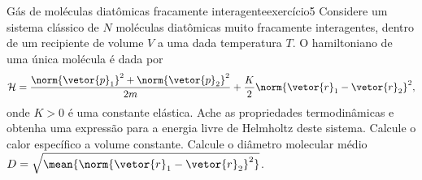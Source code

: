 \begin{exercício}{Gás de moléculas diatômicas fracamente interagente}{exercício5}
    Considere um sistema clássico de \(N\) moléculas diatômicas muito fracamente interagentes, dentro de um recipiente de volume \(V\) a uma dada temperatura \(T\). O hamiltoniano de uma única molécula é dada por
    \begin{equation*}
        \mathcal{H} = \frac{\norm{\vetor{p}_1}^2 + \norm{\vetor{p}_2}^2}{2m} + \frac{K}{2}\norm{\vetor{r}_1 - \vetor{r}_2}^2,
    \end{equation*}
    onde \(K > 0\) é uma constante elástica. Ache as propriedades termodinâmicas e obtenha uma expressão para a energia livre de Helmholtz deste sistema. Calcule o calor específico a volume constante. Calcule o diâmetro molecular médio \(D = \sqrt{\mean{\norm{\vetor{r}_1 - \vetor{r}_2}^2}}\).
\end{exercício}
